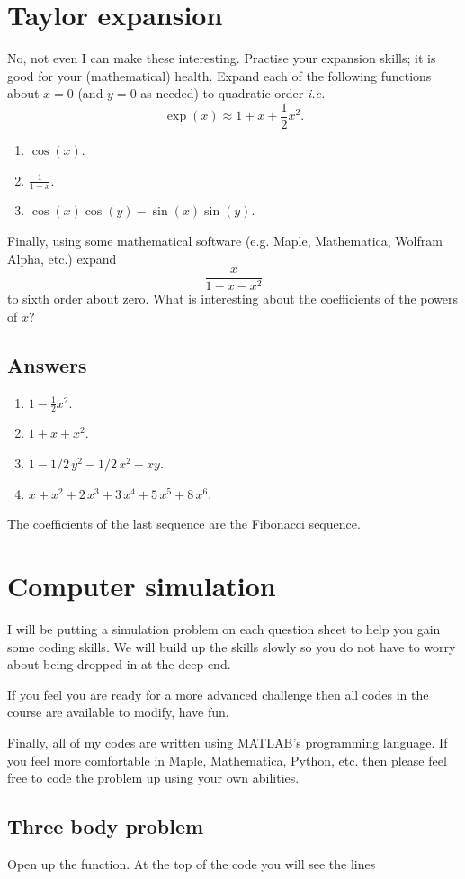 \documentclass[10pt]{article}
\newcommand{\bb}{\begin{equation}}
\newcommand{\ee}{\end{equation}}
\newcommand{\ie}{\emph{i.e.} }
\begin{document}
\section{Taylor expansion}
No, not even I can make these interesting. Practise your expansion skills; it is good for your (mathematical) health. Expand each of the following functions about $x=0$ (and $y=0$ as needed) to quadratic order \ie
\bb
\exp(x)\approx 1+x+\frac{1}{2}x^2.
\ee
\begin{enumerate}
\item $\cos(x)$.
\item $\frac{1}{1-x}$.
\item $\cos(x)\cos(y)-\sin(x)\sin(y)$.
\end{enumerate}
Finally, using some mathematical software (e.g. Maple, Mathematica, Wolfram Alpha, etc.) expand 
\bb
\frac{x}{1-x-x^2}
\ee
to sixth order about zero. What is interesting about the coefficients of the powers of $x$?
\begin{Answ}
\subsection{Answers}
\begin{enumerate}
\item $1-{\frac {1}{2}}{x}^{2}$.
\item $1+x+{x}^{2}$.
\item $1-1/2\,{y}^{2}-1/2\,{x}^{2}-xy$.
\item $x+{x}^{2}+2\,{x}^{3}+3\,{x}^{4}+5\,{x}^{5}+8\,{x}^{6}$.
\end{enumerate}
The coefficients of the last sequence are the Fibonacci sequence.
\end{Answ}
\section{Computer simulation}
I will be putting a simulation problem on each question sheet to help you gain some coding skills. We will build up the skills slowly so you do not have to worry about being dropped in at the deep end.

If you feel you are ready for a more advanced challenge then all codes in the course are available to modify, have fun.

Finally, all of my codes are written using MATLAB's programming language. If you feel more comfortable in Maple, Mathematica, Python, etc. then please feel free to code the problem up using your own abilities.
\subsection*{Three body problem}
Open up the function. At the top of the code you will see the lines
\end{document}
